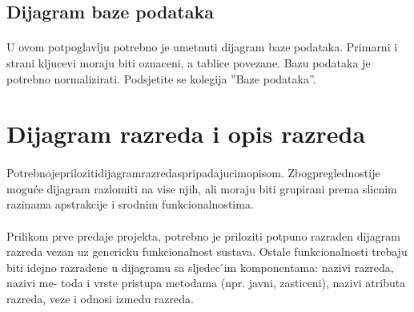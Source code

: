 \subsection{Dijagram baze podataka}
\paragraph{}
{U ovom potpoglavlju potrebno je umetnuti dijagram baze podataka. Primarni i strani kljucevi moraju biti oznaceni, a tablice povezane. Bazu podataka je potrebno normalizirati. Podsjetite se kolegija ”Baze podataka”.}



\section{Dijagram razreda i opis razreda}

\paragraph{}
{Potrebnojeprilozitidijagramrazredaspripadajucimopisom. Zbogpreglednostije moguće dijagram razlomiti na vise njih, ali moraju biti grupirani prema slicnim razinama apstrakcije i srodnim funkcionalnostima.}
\paragraph{}
{Prilikom prve predaje projekta, potrebno je priloziti potpuno razraden dijagram razreda vezan uz genericku funkcionalnost sustava. Ostale funkcionalnosti trebaju biti idejno razradene u dijagramu sa sljedec ́im komponentama: nazivi razreda, nazivi me- toda i vrste pristupa metodama (npr. javni, zasticeni), nazivi atributa razreda, veze i odnosi izmedu razreda.}


\eject